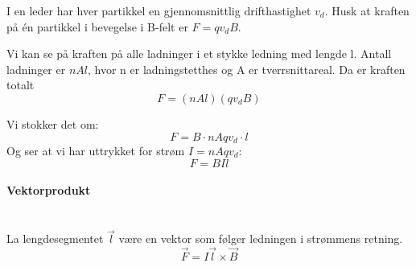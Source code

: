 I en leder har hver partikkel en gjennomsnittlig drifthastighet $v_d$.
Husk at kraften på én partikkel i bevegelse i B-felt er $F = qv_dB$.

Vi kan se på kraften på alle ladninger i et stykke ledning med lengde l.
Antall ladninger er $nAl$, hvor n er ladningstetthes og A er tverrsnittareal.
Da er kraften totalt
$$F = (nAl)(qv_dB)$$

Vi stokker det om:
$$F = B \cdot nAqv_d \cdot l$$
Og ser at vi har uttrykket for strøm $I = nAqv_d$:
$$F = BIl$$



\paragraph{Vektorprodukt} \hfill \\
La lengdesegmentet $\vec{l}$ være en vektor
som følger ledningen i strømmens retning.
$$\vec{F} = I\vec{l} \times \vec{B}$$
